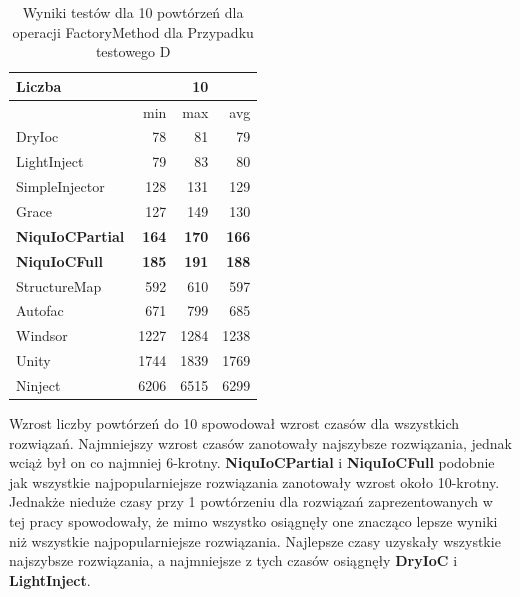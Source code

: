 \documentclass[12pt]{article}
\begin{document}
\begin{table}[H]
\captionsetup{belowskip=0pt,aboveskip=0pt}
\begin{center}
\begin{small}
	\begin{tabular}{ | l | r r r | }
    		\hline
Liczba & & 10 & \\ \hline
 & min & max & avg \\ \hline
DryIoc & 78 & 81 & 79 \\ \hline
LightInject & 79 & 83 & 80 \\ \hline
SimpleInjector & 128 & 131 & 129 \\ \hline
Grace & 127 & 149 & 130 \\ \hline
\textbf{NiquIoCPartial} & \textbf{164} & \textbf{170} & \textbf{166} \\ \hline
\textbf{NiquIoCFull} & \textbf{185} & \textbf{191} & \textbf{188} \\ \hline
StructureMap & 592 & 610 & 597 \\ \hline
Autofac & 671 & 799 & 685 \\ \hline
Windsor & 1227 & 1284 & 1238 \\ \hline
Unity & 1744 & 1839 & 1769 \\ \hline
Ninject & 6206 & 6515 & 6299 \\ \hline
  	\end{tabular}
\end{small}
\end{center}
\caption{Wyniki testów dla 10 powtórzeń dla operacji FactoryMethod dla Przypadku testowego D}
\label{TestCaseB_FactoryMethod10}
\end{table}
Wzrost liczby powtórzeń do 10 spowodował wzrost czasów dla wszystkich rozwiązań. Najmniejszy wzrost czasów zanotowały najszybsze rozwiązania, jednak wciąż był on co najmniej 6-krotny. \textbf{NiquIoCPartial} i \textbf{NiquIoCFull} podobnie jak wszystkie najpopularniejsze rozwiązania zanotowały wzrost około 10-krotny. Jednakże nieduże czasy przy 1 powtórzeniu dla rozwiązań zaprezentowanych w tej pracy spowodowały, że mimo wszystko osiągnęły one znacząco lepsze wyniki niż wszystkie najpopularniejsze rozwiązania. Najlepsze czasy uzyskały wszystkie najszybsze rozwiązania, a najmniejsze z tych czasów osiągnęły \textbf{DryIoC} i \textbf{LightInject}.



\clearpage
\end{document}
